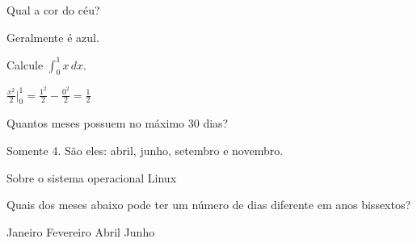 \documentclass[12pt,addpoints]{exam}
\begin{document}


\begin{questions}

\question
Qual a cor do céu?

\begin{solutionorlines}[2cm]
Geralmente é azul.
\end{solutionorlines}


\question
Calcule $\displaystyle\int_0^1 x \, dx$.

\begin{solutionorbox}[2cm]
$\displaystyle\tfrac{x^2}{2}\Big|^1_0 = \tfrac{1^2}{2} - \tfrac{0^2}{2} = \tfrac{1}{2}$
\end{solutionorbox}

\question
Quantos meses possuem no máximo 30 dias?
\begin{solutionorlines}[2cm]
Somente 4. São eles: abril, junho, setembro e novembro.
\end{solutionorlines}


\question
  Sobre o sistema operacional Linux


\question
Quais dos meses abaixo pode ter um número de dias diferente em anos bissextos?
\begin{choices}
	\choice Janeiro
	\correctchoice Fevereiro
	\choice Abril
	\choice Junho
\end{choices}

\end{questions}
\end{document}

